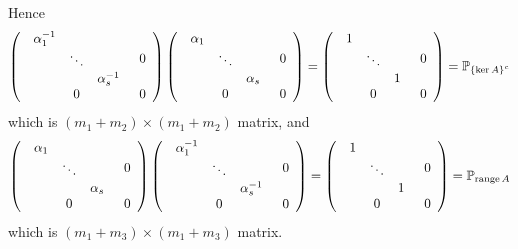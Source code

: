 \documentclass[aps,preprint]{revtex4}%
\begin{document}
Hence
\begin{equation}
\left(
\begin{array}
[c]{cc}%
\begin{array}
[c]{ccc}%
\alpha_{1}^{-1} &  & \\
& \ddots & \\
&  & \alpha_{s}^{-1}%
\end{array}
& 0\\
0 & 0
\end{array}
\right)  \left(
\begin{array}
[c]{cc}%
\begin{array}
[c]{ccc}%
\alpha_{1} &  & \\
& \ddots & \\
&  & \alpha_{s}%
\end{array}
& 0\\
0 & 0
\end{array}
\right)  =\left(
\begin{array}
[c]{cc}%
\begin{array}
[c]{ccc}%
1 &  & \\
& \ddots & \\
&  & 1
\end{array}
& 0\\
0 & 0
\end{array}
\right)  =\mathbb{P}_{\left\{  \ker A\right\}  ^{c}}%
\end{equation}
which is $\left(  m_{1}+m_{2}\right)  \times\left(  m_{1}+m_{2}\right)  $
matrix, and
\begin{equation}
\left(
\begin{array}
[c]{cc}%
\begin{array}
[c]{ccc}%
\alpha_{1} &  & \\
& \ddots & \\
&  & \alpha_{s}%
\end{array}
& 0\\
0 & 0
\end{array}
\right)  \left(
\begin{array}
[c]{cc}%
\begin{array}
[c]{ccc}%
\alpha_{1}^{-1} &  & \\
& \ddots & \\
&  & \alpha_{s}^{-1}%
\end{array}
& 0\\
0 & 0
\end{array}
\right)  =\left(
\begin{array}
[c]{cc}%
\begin{array}
[c]{ccc}%
1 &  & \\
& \ddots & \\
&  & 1
\end{array}
& 0\\
0 & 0
\end{array}
\right)  =\mathbb{P}_{\operatorname{range}A}%
\end{equation}
which is $\left(  m_{1}+m_{3}\right)  \times\left(  m_{1}+m_{3}\right)  $ matrix.
\end{document}
